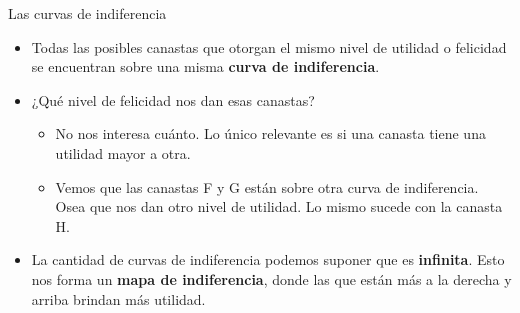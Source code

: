 \documentclass{beamer}
\begin{document}
\begin{frame}{Las curvas de indiferencia}
    \begin{itemize}
        \item Todas las posibles canastas que otorgan el mismo nivel de utilidad o felicidad se encuentran sobre una misma \textbf{curva de indiferencia}. \vspace{2mm}
        \item ¿Qué nivel de felicidad nos dan esas canastas? 
        \begin{itemize}
        \item No nos interesa cuánto. Lo único relevante es si una canasta tiene una utilidad mayor a otra. 
        \item Vemos que las canastas F y G están sobre otra curva de indiferencia. Osea que nos dan otro nivel de utilidad. Lo mismo sucede con la canasta H. \vspace{1mm}
        \end{itemize}
        \item La cantidad de curvas de indiferencia podemos suponer que es \textbf{infinita}. Esto nos forma un \textbf{mapa de indiferencia}, donde las que están más a la derecha y arriba brindan más utilidad.
    \end{itemize}
\end{frame}
\end{document}
